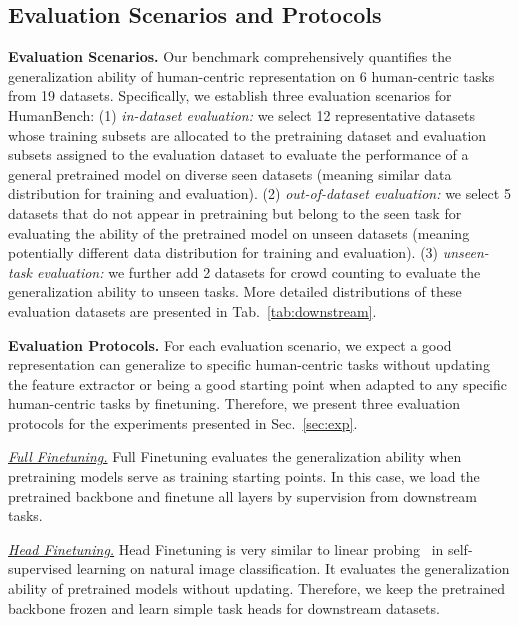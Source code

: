 \documentclass[10pt,twocolumn,letterpaper]{article}
\begin{document}
\subsection{Evaluation Scenarios and Protocols} \label{sec:evaluation_protocol}

\noindent \textbf{Evaluation Scenarios.}
Our benchmark comprehensively quantifies the generalization ability of human-centric representation on 6 human-centric tasks from 19 datasets. Specifically, we establish three evaluation scenarios for HumanBench: (1) \emph{in-dataset evaluation:} we select 12 representative datasets whose training subsets are allocated to the pretraining dataset and evaluation subsets assigned to the evaluation dataset to evaluate the performance of a general pretrained model on diverse seen datasets (meaning similar data distribution for training and evaluation). (2) \emph{out-of-dataset evaluation:} we select 5 datasets that do not appear in pretraining but belong to the seen task for evaluating the ability of the pretrained model on unseen datasets (meaning potentially different data distribution for training and evaluation). (3) \emph{unseen-task evaluation:} we further add 2 datasets for crowd counting to evaluate the generalization ability to unseen tasks. More detailed distributions of these evaluation datasets are presented in Tab.~\ref{tab:downstream}.




\noindent \textbf{Evaluation Protocols.} For each evaluation scenario, we expect a good representation can generalize to specific human-centric tasks without updating the feature extractor or being a good starting point when adapted to any specific human-centric tasks by finetuning. Therefore, we present three evaluation protocols for the experiments presented in Sec.~\ref{sec:exp}.

\noindent \underline{\emph{Full Finetuning.}} Full Finetuning evaluates the generalization ability when pretraining models serve as training starting points. In this case, we load the pretrained backbone and finetune all layers by supervision from downstream tasks.

\noindent \underline{\emph{Head Finetuning.}} Head Finetuning is very similar to linear probing~\cite{he2020momentum} in self-supervised learning on natural image classification. It evaluates the generalization ability of pretrained models without updating. Therefore, we keep the pretrained backbone frozen and learn simple task heads for downstream datasets.
\end{document}
